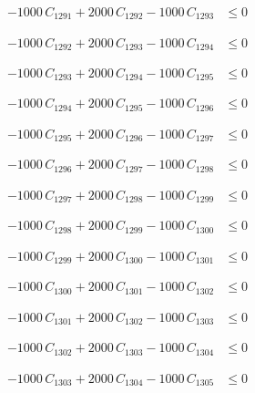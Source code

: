 \documentclass[a4paper,11pt]{article}
\begin{document}
\begin{align}
-1000\,C_{1291} + 2000\,C_{1292} - 1000\,C_{1293} &\leq 0 \nonumber
\end{align}

\begin{align}
-1000\,C_{1292} + 2000\,C_{1293} - 1000\,C_{1294} &\leq 0 \nonumber
\end{align}

\begin{align}
-1000\,C_{1293} + 2000\,C_{1294} - 1000\,C_{1295} &\leq 0 \nonumber
\end{align}

\begin{align}
-1000\,C_{1294} + 2000\,C_{1295} - 1000\,C_{1296} &\leq 0 \nonumber
\end{align}

\begin{align}
-1000\,C_{1295} + 2000\,C_{1296} - 1000\,C_{1297} &\leq 0 \nonumber
\end{align}

\begin{align}
-1000\,C_{1296} + 2000\,C_{1297} - 1000\,C_{1298} &\leq 0 \nonumber
\end{align}

\begin{align}
-1000\,C_{1297} + 2000\,C_{1298} - 1000\,C_{1299} &\leq 0 \nonumber
\end{align}

\begin{align}
-1000\,C_{1298} + 2000\,C_{1299} - 1000\,C_{1300} &\leq 0 \nonumber
\end{align}

\begin{align}
-1000\,C_{1299} + 2000\,C_{1300} - 1000\,C_{1301} &\leq 0 \nonumber
\end{align}

\begin{align}
-1000\,C_{1300} + 2000\,C_{1301} - 1000\,C_{1302} &\leq 0 \nonumber
\end{align}

\begin{align}
-1000\,C_{1301} + 2000\,C_{1302} - 1000\,C_{1303} &\leq 0 \nonumber
\end{align}

\begin{align}
-1000\,C_{1302} + 2000\,C_{1303} - 1000\,C_{1304} &\leq 0 \nonumber
\end{align}

\begin{align}
-1000\,C_{1303} + 2000\,C_{1304} - 1000\,C_{1305} &\leq 0 \nonumber
\end{align}
\end{document}
